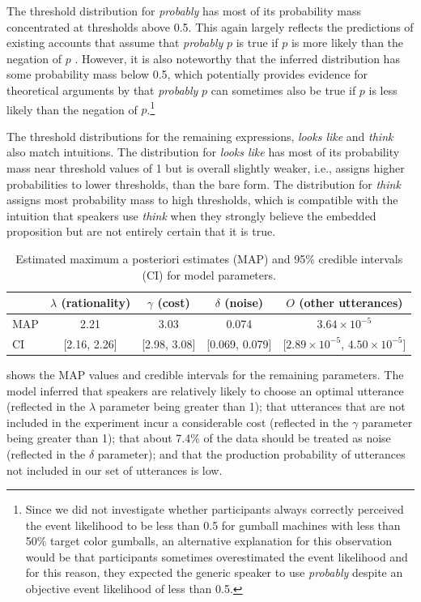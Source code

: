 The threshold distribution for \textit{probably} has most of its probability mass concentrated at thresholds above 0.5. This again largely reflects the predictions of 
existing accounts that assume that \textit{probably} $p$ is true if $p$ is more likely than the negation of $p$ \cite[e.g.,][]{Kratzer1991}. However, it is also noteworthy that the inferred
distribution has some probability mass below 0.5, which potentially provides evidence for theoretical arguments by \cite{Yalcin2010} that \textit{probably} $p$ can
sometimes also be true if $p$ is less likely than the negation of $p$.\footnote{Since we did not investigate whether participants always 
correctly perceived the event likelihood to be less than 0.5 for gumball machines with less than 50\% target color gumballs, an alternative explanation for this observation would be that participants sometimes overestimated the event likelihood and for this reason, they expected the generic speaker to use \textit{probably} despite an objective event likelihood of less than 0.5.}

The threshold distributions for the remaining expressions, \textit{looks like} and \textit{think} also match intuitions. The distribution for 
\textit{looks like} has most of its probability mass near threshold values of 1 but is overall slightly weaker, i.e., assigns higher probabilities to lower thresholds,
than the bare form. The distribution for \textit{think} assigns most probability mass to high thresholds, which is compatible with the intuition
that speakers use \textit{think} when they strongly believe the embedded proposition but are not entirely certain that it is true.
 
 
 \begin{table}[ht!]
\center
\begin{tabular}{l | c | c | c | c }
     & $\lambda$ (rationality) & $\gamma$ (cost) & $\delta$ (noise) & $O$ (other utterances) \\
      \midrule
      MAP & 2.21 & 3.03 & 0.074 & $3.64 \times 10^{-5}$ \\
      CI & [2.16, 2.26] & [2.98, 3.08] &  [0.069, 0.079] &[$2.89 \times 10^{-5}$, $4.50  \times 10^{-5}$] \\
         \end{tabular}
\caption{Estimated maximum a posteriori estimates (MAP) and 95\% credible intervals (CI) for model parameters. \label{tbl:model-params}}
\end{table}

 shows the MAP values and credible intervals for the remaining parameters. The model inferred that speakers
are relatively likely to choose an optimal utterance (reflected in the $\lambda$ parameter being
greater than 1); that utterances that are not included in the experiment incur a considerable cost  (reflected in the $\gamma$ parameter being greater than 1); that about 7.4\%
of the data should be treated as noise (reflected in the $\delta$ parameter); and that the production probability of utterances not included in our set of utterances is low. 

